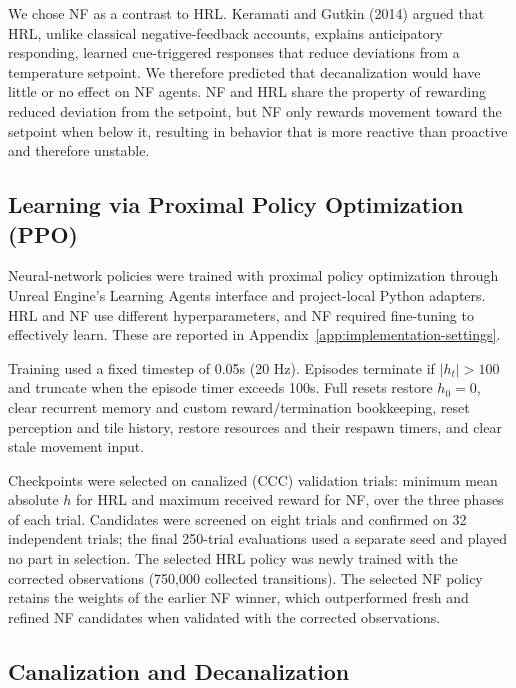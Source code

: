 \documentclass[12pt,fleqn]{article}
\begin{document}
We chose NF as a contrast to HRL. Keramati and Gutkin (2014) argued that HRL, unlike classical negative-feedback accounts, explains anticipatory responding, learned cue-triggered responses that reduce deviations from a temperature setpoint. We therefore predicted that decanalization would have little or no effect on NF agents. NF and HRL share the property of rewarding reduced deviation from the setpoint, but NF only rewards movement toward the setpoint when below it, resulting in behavior that is more reactive than proactive and therefore unstable.

\subsection{Learning via Proximal Policy Optimization (PPO)}\label{sec:ppo}

Neural-network policies were trained with proximal policy optimization \cite{schulman_proximal_2017} through Unreal Engine's Learning Agents interface and project-local Python adapters. HRL and NF use different hyperparameters, and NF required fine-tuning to effectively learn. These are reported in Appendix~\ref{app:implementation-settings}.

Training used a fixed timestep of 0.05s (20 Hz). Episodes terminate if $|h_t|>100$ and truncate when the episode timer exceeds 100s. Full resets restore $h_0=0$, clear recurrent memory and custom reward/termination bookkeeping, reset perception and tile history, restore resources and their respawn timers, and clear stale movement input.

Checkpoints were selected on canalized (CCC) validation trials: minimum mean absolute $h$ for HRL and maximum received reward for NF, over the three phases of each trial. Candidates were screened on eight trials and confirmed on 32 independent trials; the final 250-trial evaluations used a separate seed and played no part in selection. The selected HRL policy was newly trained with the corrected observations (750,000 collected transitions). The selected NF policy retains the weights of the earlier NF winner, which outperformed fresh and refined NF candidates when validated with the corrected observations.

\subsection{Canalization and Decanalization}\label{sec:protocol}
\end{document}
